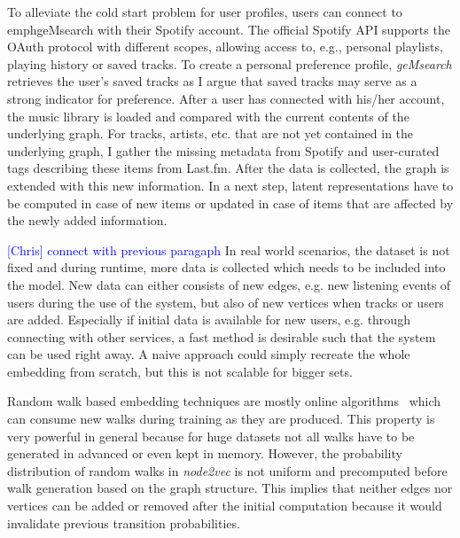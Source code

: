 \documentclass[sigconf]{acmart}
\newcommand{\ce}[1]{\textcolor{blue}{[Chris] #1}}
\newcommand{\ce}[1]{}
\begin{document}
To alleviate the cold start problem for user profiles, users can connect to emph{geMsearch} with their Spotify account. The official Spotify API supports the OAuth protocol with different scopes, allowing access to, e.g., personal playlists, playing history or saved tracks. To create a personal preference profile, \emph{geMsearch} retrieves the user's saved tracks as I argue that saved tracks may serve as a strong indicator for preference. %
After a user has connected with his/her account, the music library is loaded and compared with the current contents of the underlying graph. For tracks, artists, etc. that are not yet contained in the underlying graph, I gather the missing metadata from Spotify and user-curated tags describing these items from Last.fm. After the data is collected, the graph is extended with this new information. In a next step, latent representations have to be computed in case of new items or updated in case of items that are affected by the newly added information.

\ce{connect with previous paragaph}
In real world scenarios, the dataset is not fixed and during runtime, more data is collected which needs to be included into the model. New data can either consists of new edges, e.g. new listening events of users during the use of the system, but also of new vertices when tracks or users are added. Especially if initial data is available for new users, e.g. through connecting with other services, a fast method is desirable such that the system can be used right away. A naive approach could simply recreate the whole embedding from scratch, but this is not scalable for bigger sets.



 

Random walk based embedding techniques are mostly online algorithms~\cite{perozzi2014deepwalk}\cite{grover2016node2vec} which can consume new walks during training as they are produced. This property is very powerful in general because for huge datasets not all walks have to be generated in advanced or even kept in memory. However, the probability distribution of random walks in \emph{node2vec} is not uniform and precomputed before walk generation based on the graph structure. This implies that neither edges nor vertices can be added or removed after the initial computation because it would invalidate previous transition probabilities.
\end{document}
